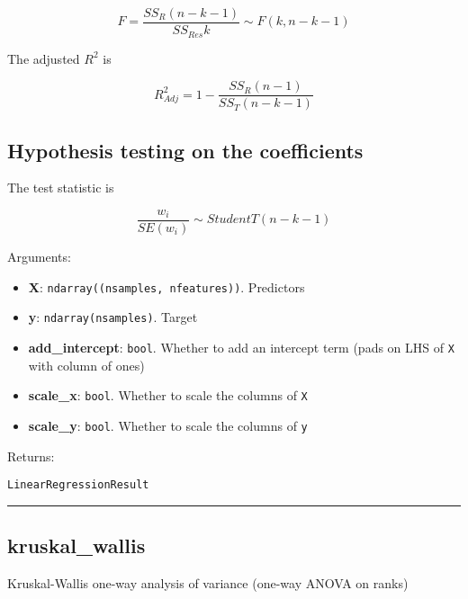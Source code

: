 \[
F = \frac{SS_R (n-k-1)}{SS_{Res} k} \sim F(k, n-k-1)
\]

The adjusted \(R^2\) is

\[
R^2_{Adj} = 1 - \frac{SS_R (n-1)}{SS_T (n-k-1)}
\]

\subsection{Hypothesis testing on the
coefficients}\label{hypothesis-testing-on-the-coefficients}

The test statistic is

\[
\frac{w_i}{SE(w_i)} \sim StudentT(n-k-1)
\]

Arguments:

\begin{itemize}
\tightlist
\item
  \textbf{X}: \texttt{ndarray((nsamples,\ nfeatures))}. Predictors
\item
  \textbf{y}: \texttt{ndarray(nsamples)}. Target
\item
  \textbf{add\_intercept}: \texttt{bool}. Whether to add an intercept
  term (pads on LHS of \texttt{X} with column of ones)
\item
  \textbf{scale\_x}: \texttt{bool}. Whether to scale the columns of
  \texttt{X}
\item
  \textbf{scale\_y}: \texttt{bool}. Whether to scale the columns of
  \texttt{y}
\end{itemize}

Returns:

\texttt{LinearRegressionResult}

\begin{center}\rule{0.5\linewidth}{\linethickness}\end{center}

\subsection{kruskal\_wallis}\label{kruskal_wallis}

\begin{Shaded}
\begin{Highlighting}[]
\OperatorTok{=}\NormalTok{)}
\end{Highlighting}
\end{Shaded}

Kruskal-Wallis one-way analysis of variance (one-way ANOVA on ranks)

